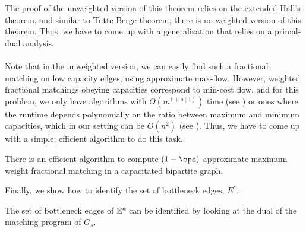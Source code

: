 The proof of the unweighted version of this theorem relies on the extended Hall's theorem, and similar to Tutte Berge theorem, there is no weighted version of this theorem. Thus, we have to come up with a generalization that relies on a primal-dual analysis. \\ \\
Note that in the unweighted version, we can easily find such a fractional matching on low capacity edges, using approximate max-flow. However, weighted fractional matchings obeying capacities correspond to min-cost flow, and for this problem, we only have algorithms with $O(m^{1+o(1)})$ time (see \cite{BPT20,BrandCKLPGSS}) or ones where the runtime depends polynomially on the ratio between maximum and minimum capacities, which in our setting can be $O(n^2)$ (see \cite{GoldbergHKT17}). Thus, we have to come up with a simple, efficient algorithm to do this task.

\begin{lemma2}
There is an efficient algorithm to compute $(1-\eps)$-approximate maximum weight fractional matching in a capacitated bipartite graph. 
\end{lemma2}

Finally, we show how to identify the set of bottleneck edges, $E^*$.

\begin{lemma2}The set of bottleneck edges of E* can be identified by looking at the dual of the matching program of $G_s$. 
\end{lemma2}

